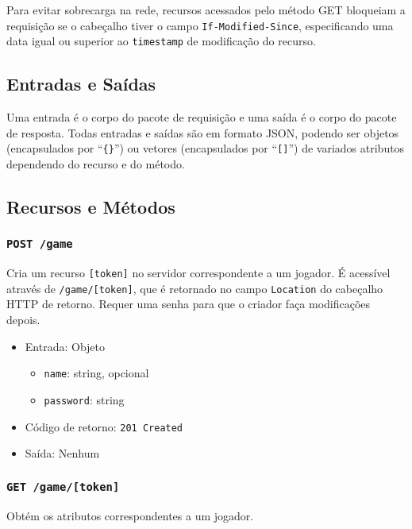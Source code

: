 \documentclass[12pt,a4paper]{article}
\begin{document}
Para evitar sobrecarga na rede, recursos acessados pelo método GET bloqueiam a
requisição se o cabeçalho tiver o campo \texttt{If-Modified-Since},
especificando uma data igual ou superior ao \texttt{timestamp} de modificação
do recurso.

\subsection{Entradas e Saídas}

Uma entrada é o corpo do pacote de requisição e uma saída é o corpo do pacote
de resposta. Todas entradas e saídas são em formato JSON, podendo ser objetos
(encapsulados por ``\texttt{\{\}}'') ou vetores (encapsulados por
``\texttt{[]}'') de variados atributos dependendo do recurso e do método.

\subsection{Recursos e Métodos}

\subsubsection{\texttt{POST /game}}

Cria um recurso \texttt{[token]} no servidor correspondente a um jogador. É
acessível através de \texttt{/game/[token]}, que é retornado no campo
\texttt{Location} do cabeçalho HTTP de retorno. Requer uma senha para que o
criador faça modificações depois.

\begin{itemize}
	\item Entrada: Objeto
		\begin{itemize}
			\item \texttt{name}: string, opcional
			\item \texttt{password}: string
		\end{itemize}
	\item Código de retorno: \texttt{201 Created}
	\item Saída: Nenhum
\end{itemize}

\subsubsection{\texttt{GET /game/[token]}}

Obtém os atributos correspondentes a um jogador.
\end{document}
